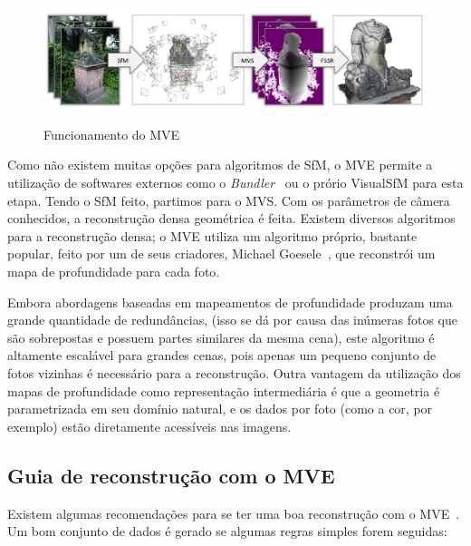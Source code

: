 \begin{figure}[!h]
	\centering
	\caption{Funcionamento do MVE}
	\includegraphics[width=\linewidth]{figs/mvepipe.png}
   \label{fig:mvepipeline}
\end{figure}

Como não existem muitas opções para algoritmos de SfM, o MVE permite a
utilização de softwares externos como o
\emph{Bundler}~\cite{snavely2010bundler} ou o prório VisualSfM para esta
etapa.  Tendo o SfM feito, partimos para o MVS. Com os parâmetros
de câmera conhecidos, a reconstrução densa geométrica é feita. Existem diversos
algoritmos para a reconstrução densa; o MVE utiliza um algoritmo
próprio, bastante popular, feito por um de seus criadores, Michael
Goesele~\cite{goesele2007multi}, que reconstrói um mapa de profundidade para
cada foto. 

Embora abordagens baseadas em mapeamentos de profundidade produzam uma grande
quantidade de redundâncias, (isso se dá por causa das inúmeras fotos que são
sobrepostas e possuem partes similares da mesma cena), este algoritmo é
altamente escalável para grandes cenas, pois apenas um pequeno conjunto de fotos
vizinhas é necessário para a reconstrução. Outra vantagem da utilização dos
mapas de profundidade como representação intermediária é que a geometria é
parametrizada em seu domínio natural, e os dados por foto (como a cor, por
exemplo) estão diretamente acessíveis nas imagens.

\subsection{Guia de reconstrução com o MVE}
Existem algumas recomendações para se ter uma boa reconstrução com o MVE~\cite{mve}.
Um bom conjunto de dados é gerado se algumas regras simples forem seguidas:

